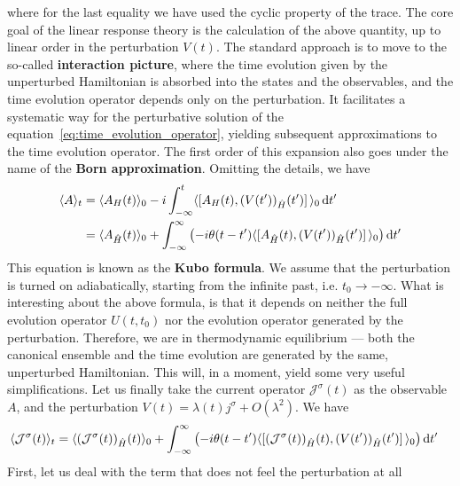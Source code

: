 where for the last equality we have used the cyclic property of the trace. The core goal of the linear response
theory is the calculation of the above quantity, up to linear order in the perturbation \(V(t)\).
The standard approach is to move to the so-called \textbf{interaction picture}, where the time evolution
given by the unperturbed Hamiltonian is absorbed into the states and the observables, and the time evolution
operator depends only on the perturbation. It facilitates a systematic way for the perturbative solution
of the equation~\eqref{eq:time_evolution_operator}, yielding subsequent approximations to the time evolution
operator. The first order of this expansion also goes under the name of the \textbf{Born approximation}.
Omitting the details, we have
\begin{align}
    \langle A \rangle_t & = \langle A_{H}(t) \rangle_0
    - i \int_{-\infty }^{t}  \langle \comm*{A_{H}(t)}
    {(V(t^{\prime} ))_{\hat{H} }(t^{\prime} )} \rangle_0 \dd{t^{\prime}} \nonumber \\
                        & = \langle A_{\hat{H} }(t) \rangle_0
    + \int_{-\infty }^{\infty } \left(-i \theta (t-t^{\prime} ) \langle \comm*{A_{\hat{H} }(t) }
        {(V(t^{\prime} ))_{\hat{H} }(t^{\prime} )} \rangle_0 \right) \dd{t^{\prime} }
    \label{eq:linear_response}
\end{align}
This equation is known as the \textbf{Kubo formula}. We assume that the perturbation is turned on adiabatically,
starting from the infinite past, i.e. \(t_0 \to -\infty \). What is interesting about the above formula, is that
it depends on neither the full evolution operator \(U(t,t_0)\) nor the evolution operator
generated by the perturbation. Therefore, we are in thermodynamic equilibrium — both the canonical ensemble and
the time evolution are generated by the same, unperturbed Hamiltonian. This will, in a moment, yield some
very useful simplifications.
Let us finally take the current operator \(\mathcal{J}^{\sigma }(t)\) as the observable \(A\), and
the perturbation \(V(t) = \lambda(t) j^{\sigma } + O(\lambda^2)\).
We have
\begin{align}
    \langle \mathcal{J}^{\sigma }(t) \rangle_t & = \langle (\mathcal{J}^{\sigma }(t))_{\hat{H} }(t) \rangle_0 +
    \int_{-\infty}^{\infty } \left(-i \theta (t-t^{\prime} ) \langle \comm*{(\mathcal{J}^{\sigma }(t))_{\hat{H} }(t) }
        {(V(t^{\prime} ))_{\hat{H} }(t^{\prime} )} \rangle_0 \right)\dd{t^{\prime} }
\end{align}
First, let us deal with the term that does not feel the perturbation at all
